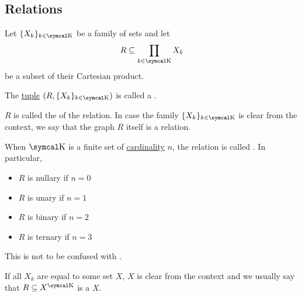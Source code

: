 \subsection{Relations}\label{subsec:relations}

\begin{definition}\label{def:relation}
  Let \( \{ X_k \}_{k \in \CK} \) be a family of sets and let
  \begin{equation*}
    R \subseteq \prod_{k \in \CK} X_k
  \end{equation*}
  be a subset of their Cartesian product.

  The \hyperref[def:cartesian_product]{tuple} \( (R,  \{ X_k \}_{k \in \CK}) \) is called a .

  \begin{DefEnum}
     \( R \) is called the  of the relation. In case the family \( \{ X_k \}_{k \in \CK} \) is clear from the context, we say that the graph \( R \) itself is a relation.

     When \( \CK \) is a finite set of \hyperref[remark:cardinals]{cardinality} \( n \), the relation is called . In particular,
    \begin{itemize}
      \item \( R \) is nullary if \( n = 0 \)
      \item \( R \) is unary if \( n = 1 \)
      \item \( R \) is binary if \( n = 2 \)
      \item \( R \) is ternary if \( n = 3 \)
    \end{itemize}

    This is not to be confused with .

     If all \( X_k \) are equal to some set \( X \), \( X \) is clear from the context and we usually say that \( R \subseteq X^{\CK} \) is a  \( X \).
  \end{DefEnum}
\end{definition}

